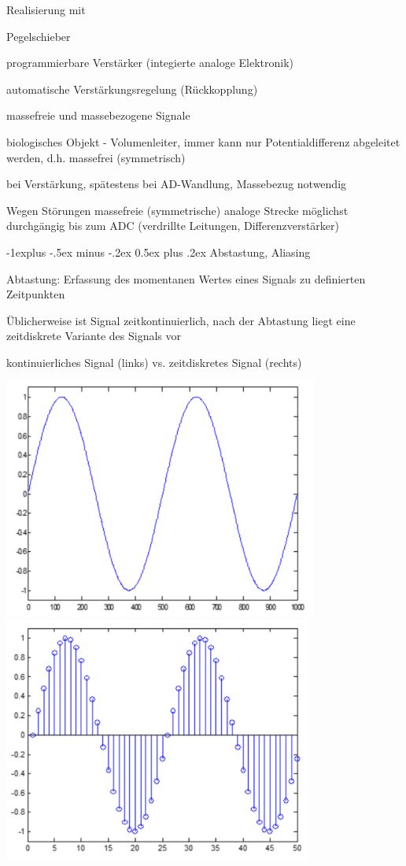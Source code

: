 \documentclass[a4paper]{article}
\makeatletter
\renewcommand{\subsection}{\@startsection{subsection}{2}{0mm}%
 {-1explus -.5ex minus -.2ex}%
 {0.5ex plus .2ex}%
 {\normalfont\normalsize\bfseries}}
\makeatother
\begin{document}
\begin{multicols}{3}
  Realisierung mit
  \begin{itemize*}
    \item Pegelschieber
    \item programmierbare Verstärker (integierte analoge Elektronik)
    \item automatische Verstärkungsregelung (Rückkopplung)
  \end{itemize*}

  massefreie und massebezogene Signale
  \begin{itemize*}
    \item biologisches Objekt - Volumenleiter, immer kann nur Potentialdifferenz abgeleitet werden, d.h. massefrei (symmetrisch)
    \item bei Verstärkung, spätestens bei AD-Wandlung, Massebezug notwendig
    \item Wegen Störungen massefreie (symmetrische) analoge Strecke möglichst durchgängig bis zum ADC (verdrillte Leitungen, Differenzverstärker)
  \end{itemize*}

  \subsection{Abstastung, Aliasing}\label{abstastung-aliasing}
  \begin{itemize*}
    \item Abtastung: Erfassung des momentanen Wertes eines Signals zu definierten Zeitpunkten
    \item Üblicherweise ist Signal zeitkontinuierlich, nach der Abtastung liegt eine zeitdiskrete Variante des Signals vor
    \item kontinuierliches Signal (links) vs. zeitdiskretes Signal (rechts)
  \end{itemize*}
  \begin{center}
    \includegraphics[width=.3\linewidth]{Assets/Biosignalverarbeitung-kontinuierliches-signal.png}
    \includegraphics[width=.3\linewidth]{Assets/Biosignalverarbeitung-zeitdiskretes-signal.png}
  \end{center}


\end{multicols}
\end{document}
